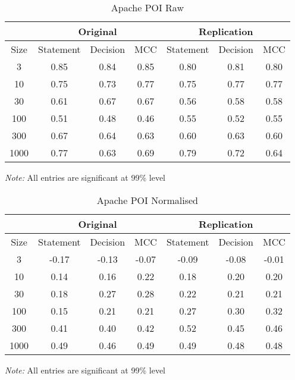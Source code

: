 \begin{table}[h]
	\caption{Apache POI Raw}
	\label{tab:poiraw}
	\begin{minipage}{0.7\columnwidth}
		\begin{center}
			\begin{tabular}{cccc|ccc}
				\toprule
				& \multicolumn{3}{c}{Original} & \multicolumn{3}{c}{Replication} \\
				\hline
				Size & Statement & Decision & MCC & Statement & Decision & MCC  \\
				\hline
				3   & 0.85 & 0.84 & 0.85 & 0.80 & 0.81 & 0.80\\
				10  & 0.75 & 0.73 & 0.77 & 0.75 & 0.77 & 0.77\\
				30  & 0.61 & 0.67 & 0.67 & 0.56  & 0.58  & 0.58 \\
				100 & 0.51 & 0.48 & 0.46 & 0.55  & 0.52  & 0.55 \\
				300 & 0.67 & 0.64 & 0.63 & 0.60  & 0.63  & 0.60 \\
				1000 & 0.77 & 0.63 & 0.69 & 0.79  & 0.72 & 0.64 \\
				\bottomrule
			\end{tabular}
		\end{center}
		\bigskip
		\emph{Note:} All entries are significant at 99\% level
	\end{minipage}
\end{table}

\begin{table}[h]
	\caption{Apache POI Normalised}
	\label{tab:poinorm}
	\begin{minipage}{0.7\columnwidth}
		\begin{center}
			\begin{tabular}{cccc|ccc}
				\toprule
				& \multicolumn{3}{c}{Original} & \multicolumn{3}{c}{Replication} \\
				\hline
				Size & Statement & Decision & MCC & Statement & Decision & MCC  \\
				\hline
				3   & -0.17 & -0.13 & -0.07 & -0.09\textborn & -0.08\textborn & -0.01\textborn \\
				10  & 0.14 & 0.16 & 0.22 & 0.18 & 0.20 & 0.20\\
				30  & 0.18 & 0.27 & 0.28 & 0.22 & 0.21  & 0.21 \\
				100 & 0.15 & 0.21 & 0.21 & 0.27  & 0.30  & 0.32 \\
				300 & 0.41 & 0.40 & 0.42 & 0.52  & 0.45  & 0.46 \\
				1000 & 0.49 & 0.46 & 0.49 & 0.49  & 0.48 & 0.48 \\
				\bottomrule
			\end{tabular}
		\end{center}
		\bigskip
		\emph{Note:} All entries are significant at 99\% level
	\end{minipage}
\end{table}

